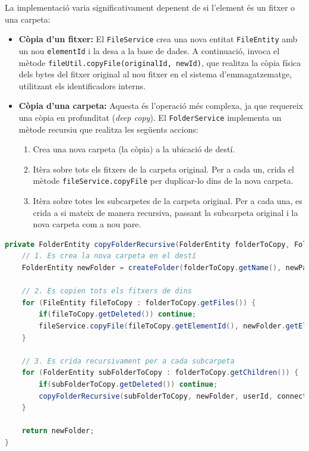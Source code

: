 La implementació varia significativament depenent de si l'element és un fitxer o una carpeta:
\begin{itemize}
    \item \textbf{Còpia d'un fitxer:} El \texttt{FileService} crea una nova entitat \texttt{FileEntity} amb un nou \texttt{elementId} i la desa a la base de dades. A continuació, invoca el mètode \texttt{fileUtil.copyFile(originalId, newId)}, que realitza la còpia física dels bytes del fitxer original al nou fitxer en el sistema d'emmagatzematge, utilitzant els identificadors interns.
    
    \item \textbf{Còpia d'una carpeta:} Aquesta és l'operació més complexa, ja que requereix una còpia en profunditat (\textit{deep copy}). El \texttt{FolderService} implementa un mètode recursiu que realitza les següents accions:
    \begin{enumerate}
        \item Crea una nova carpeta (la còpia) a la ubicació de destí.
        \item Itèra sobre tots els fitxers de la carpeta original. Per a cada un, crida el mètode \texttt{fileService.copyFile} per duplicar-lo dins de la nova carpeta.
        \item Itèra sobre totes les subcarpetes de la carpeta original. Per a cada una, es crida a si mateix de manera recursiva, passant la subcarpeta original i la nova carpeta com a nou pare.
    \end{enumerate}
\end{itemize}

\begin{lstlisting}[language=Java, caption={Lògica de còpia recursiva a `FolderService`}]
private FolderEntity copyFolderRecursive(FolderEntity folderToCopy, FolderEntity newParent, UUID userId, String connectionId) throws IOException {
    // 1. Es crea la nova carpeta en el destí
    FolderEntity newFolder = createFolder(folderToCopy.getName(), newParent, userId, false, connectionId);

    // 2. Es copien tots els fitxers de dins
    for (FileEntity fileToCopy : folderToCopy.getFiles()) {
        if(fileToCopy.getDeleted()) continue;
        fileService.copyFile(fileToCopy.getElementId(), newFolder.getElementId(), userId);
    }

    // 3. Es crida recursivament per a cada subcarpeta
    for (FolderEntity subFolderToCopy : folderToCopy.getChildren()) {
        if(subFolderToCopy.getDeleted()) continue;
        copyFolderRecursive(subFolderToCopy, newFolder, userId, connectionId);
    }

    return newFolder;
}
\end{lstlisting}


